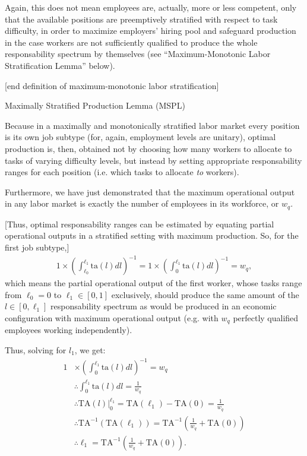 \documentclass[hidelinks, nonatbib]{elsarticle}
\begin{document}
\begin{enumerate}
Again, this does not mean employees are, actually, more or less competent, only that the available positions are preemptively stratified with respect to task difficulty, in order to maximize employers' hiring pool and safeguard production in the case workers are not sufficiently qualified to produce the whole responsability spectrum by themselves (see ``Maximum-Monotonic Labor Stratification Lemma'' below).

[end definition of maximum-monotonic labor stratification]

Maximally Stratified Production Lemma (MSPL)

Because in a maximally and monotonically stratified labor market every position is its own job subtype (for, again, employment levels are unitary), optimal production is, then, obtained not by choosing how many workers to allocate to tasks of varying difficulty levels, but instead by setting appropriate responsability ranges for each position (i.e. which tasks to allocate \textit{to} workers).

Furthermore, we have just demonstrated that the maximum operational output in any labor market is exactly the number of employees in its workforce, or $w_q$.

[Thus, optimal responsability ranges can be estimated by equating partial operational outputs in a stratified setting with maximum production. So, for the first job subtype,]
\begin{gather}
    1 \times \left(
        \int_{\ell_0}^{\ell_1}
        \text{ta}(l)
        dl
    \right) ^ {-1}
    =
    1 \times \left(
        \int_{0}^{\ell_1}
        \text{ta}(l)
        dl
    \right) ^ {-1}
    =
    w_q
    ,
\end{gather}
which means the partial operational output of the first worker, whose tasks range from $\ell_0 = 0$ to $\ell_1 \in [0,1]$ exclusively, should produce the same amount of the $l \in [0,\ell_1]$ responsability spectrum as would be produced in an economic configuration with maximum operational output (e.g. with $w_q$ perfectly qualified employees working independently).

Thus, solving for $l_1$, we get:
\begin{align}
    1 
    &\times 
    \left(
        \int_{0}^{\ell_1}
        \text{ta}(l)
        dl
    \right) ^ {-1}
    =
    w_q
    \\
    &\therefore
    \int_{0}^{\ell_1}
    \text{ta}(l)
    dl
    =
    \frac{1}{w_q}
    \\
    &\therefore
    \text{TA}(l)
    \big|_{0}^{\ell_1}
    =
    \text{TA}(\ell_1)
    -
    \text{TA}(0)
    =
    \frac{1}{w_q}
    \\
    &\therefore
    \text{TA}^{-1}(
        \text{TA}(\ell_1)
    )
    =
    \text{TA}^{-1}\left(
        \frac{1}{w_q}
        +
        \text{TA}(0)
    \right)
    \\
    &\therefore
    \ell_1
    =
    \text{TA}^{-1}\left(
        \frac{1}{w_q}
        +
        \text{TA}(0)
    \right)
    .
\end{align}


\end{enumerate}
\end{document}
